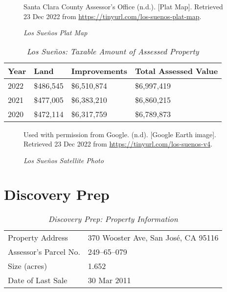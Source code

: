 \begin{figure}[hbtp]
  \caption[Los Sueños Plat Map]{\textit{Los Sueños Plat Map}}%
  \label{fig:los-sueños-plat-map}
  {Santa Clara County Assessor's Office (n.d.). [Plat Map]. Retrieved 23 Dec 2022 from \url{https://tinyurl.com/los-suenos-plat-map}.}
\end{figure}

\begin{table}[hbtp]
  \SingleSpacing%
  \caption[Los Sueños: Taxable Amount of Assessed Propery]{\textit{Los Sueños: Taxable Amount of Assessed Property}}%
  \label{tab:los-sueños-taxable-amount}
  \begin{tabular}{llll}
    \toprule
    Year & Land      & Improvements & Total Assessed Value \\
    \midrule
    2022 & \$486,545 & \$6,510,874  & \$6,997,419 \\
    2021 & \$477,005 & \$6,383,210  & \$6,860,215 \\
    2020 & \$472,114 & \$6,317,759  & \$6,789,873 \\
    \bottomrule
  \end{tabular}
\end{table}

\begin{figure}[hbtp]
  \caption[Los Sueños Satellite Photo]{\textit{Los Sueños Satellite Photo}}
  \label{fig:los-sueños-sat-photo}
  {Used with permission from Google. (n.d). [Google Earth image]. Retrieved 23 Dec 2022 from \url{https://tinyurl.com/los-suenos-v4}.}
\end{figure}


\clearpage
\section{Discovery Prep}\label{sec:discover-prep-info}\indent

\begin{table}[htbp]
  \SingleSpacing%
  \caption[Discovery Prep: Property Information]{\textit{Discovery Prep: Property Information}}%
  \label{tab:discovery-prep-prop-info}
  \begin{tabular}{ll}
    \toprule
    Property Address      & 370 Wooster Ave, San José, CA 95116 \\
    Assessor's Parcel No. &  249–65–079 \\
    Size (acres)          & 1.652 \\
    Date of Last Sale     & 30 Mar 2011\\
    \bottomrule
  \end{tabular}
\end{table}

